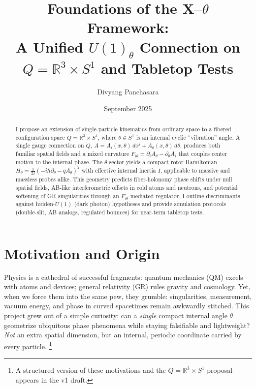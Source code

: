\title{Foundations of the X--$\theta$ Framework:\\
A Unified $U(1)_\theta$ Connection on $Q=\mathbb{R}^3\times S^1$ and Tabletop Tests}

\author{Divyang Panchasara}
\date{September 2025}

\maketitle

\begin{abstract}
I propose an extension of single-particle kinematics from ordinary space to a fibered configuration space
$Q=\mathbb{R}^3\times S^1$, where $\theta\in S^1$ is an internal cyclic ``vibration'' angle. A single gauge connection
on $Q$,
$A = A_i(x,\theta)\,dx^i + A_\theta(x,\theta)\,d\theta$,
produces both familiar spatial fields and a mixed curvature $F_{i\theta}=\partial_iA_\theta-\partial_\theta A_i$ that couples
center motion to the internal phase. The $\theta$-sector yields a compact-rotor Hamiltonian
$H_\theta=\tfrac{1}{2I}(-i\hbar\partial_\theta-qA_\theta)^2$ with effective internal inertia $I$, applicable to
massive and massless probes alike. This geometry predicts fiber-holonomy phase shifts under null spatial fields,
AB-like interferometric offsets in cold atoms and neutrons, and potential softening of GR singularities through
an $F_{i\theta}$-mediated regulator. I outline discriminants against hidden-$U(1)$ (dark photon) hypotheses and
provide simulation protocols (double-slit, AB analogs, regulated bounces) for near-term tabletop tests.
\end{abstract}

\section{Motivation and Origin}
Physics is a cathedral of successful fragments: quantum mechanics (QM) excels with atoms and devices;
general relativity (GR) rules gravity and cosmology. Yet, when we force them into the same pew,
they grumble: singularities, measurement, vacuum energy, and phase in curved spacetimes remain awkwardly
stitched. This project grew out of a simple curiosity: can a \emph{single} compact internal angle $\theta$
geometrize ubiquitous phase phenomena while staying falsifiable and lightweight? \emph{Not} an extra spatial
dimension, but an internal, periodic coordinate carried by every particle.%
\footnote{A structured version of these motivations and the $Q=\mathbb{R}^3\times S^1$ proposal appears in the v1 draft.}
\label{sec:motivation}
\medskip

